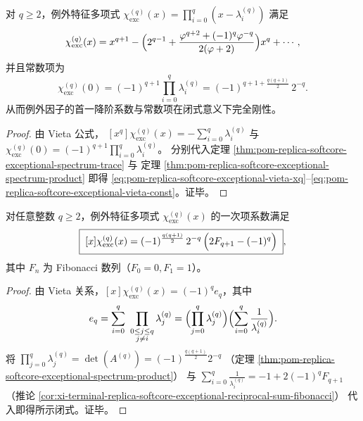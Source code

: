 


\begin{theorem}\label{thm:pom-replica-softcore-exceptional-vieta-endpoints}
对 \(q\ge 2\)，例外特征多项式
\(
\chi_{\mathrm{exc}}^{(q)}(x)=\prod_{i=0}^{q}(x-\lambda_i^{(q)})
\)
满足
\begin{equation}\label{eq:pom-replica-softcore-exceptional-vieta-xq}
\chi_{\mathrm{exc}}^{(q)}(x)
=x^{q+1}
-\Bigl(2^{q-1}+\frac{\varphi^{q+2}+(-1)^q\varphi^{-q}}{2(\varphi+2)}\Bigr)x^{q}
+\cdots,
\end{equation}
并且常数项为
\begin{equation}\label{eq:pom-replica-softcore-exceptional-vieta-const}
\chi_{\mathrm{exc}}^{(q)}(0)
=(-1)^{q+1}\prod_{i=0}^{q}\lambda_i^{(q)}
=(-1)^{q+1+\frac{q(q+1)}{2}}\,2^{-q}.
\end{equation}
从而例外因子的首一降阶系数与常数项在闭式意义下完全刚性。
\end{theorem}
\begin{proof}
由 Vieta 公式，
\(
[x^{q}]\chi_{\mathrm{exc}}^{(q)}(x)=-\sum_{i=0}^{q}\lambda_i^{(q)}
\)
与
\(
\chi_{\mathrm{exc}}^{(q)}(0)=(-1)^{q+1}\prod_{i=0}^{q}\lambda_i^{(q)}
\)。
分别代入定理 \ref{thm:pom-replica-softcore-exceptional-spectrum-trace} 与
定理 \ref{thm:pom-replica-softcore-exceptional-spectrum-product}
即得 \eqref{eq:pom-replica-softcore-exceptional-vieta-xq}--\eqref{eq:pom-replica-softcore-exceptional-vieta-const}。证毕。
\end{proof}

\begin{corollary}[例外特征多项式一次项系数的显式闭式]\label{cor:pom-replica-softcore-exceptional-charpoly-linear-coefficient}
对任意整数 \(q\ge 2\)，例外特征多项式 \(\chi_{\mathrm{exc}}^{(q)}(x)\) 的一次项系数满足
\[
\boxed{\;
[x]\chi_{\mathrm{exc}}^{(q)}(x)
=(-1)^{\frac{q(q+1)}{2}}\,2^{-q}\,\Bigl(2F_{q+1}-(-1)^q\Bigr)\; } ,
\]
其中 \(F_n\) 为 Fibonacci 数列（\(F_0=0,F_1=1\)）。
\end{corollary}
\begin{proof}
由 Vieta 关系，\([x]\chi_{\mathrm{exc}}^{(q)}(x)=(-1)^q e_q\)，其中
\[
e_q=\sum_{i=0}^{q}\ \prod_{\substack{0\le j\le q\\ j\ne i}}\lambda_j^{(q)}
=\Bigl(\prod_{j=0}^{q}\lambda_j^{(q)}\Bigr)\Bigl(\sum_{i=0}^{q}\frac{1}{\lambda_i^{(q)}}\Bigr).
\]
将
\(\prod_{j=0}^{q}\lambda_j^{(q)}=\det(A^{(q)})=(-1)^{\frac{q(q+1)}{2}}2^{-q}\)
（定理 \ref{thm:pom-replica-softcore-exceptional-spectrum-product}）
与
\(\sum_{i=0}^{q}\frac{1}{\lambda_i^{(q)}}=-1+2(-1)^qF_{q+1}\)
（推论 \ref{cor:xi-terminal-replica-softcore-exceptional-reciprocal-sum-fibonacci}）
代入即得所示闭式。证毕。
\end{proof}

